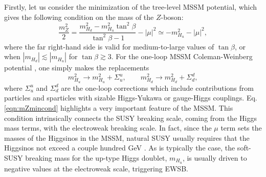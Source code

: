  Firstly, let us consider the minimization of the tree-level MSSM potential, which gives the following condition on the mass of the $Z$-boson:
\begin{equation}
\frac{m^2_Z}{2}=\frac{m^2_{H_d}-m^2_{H_u}\tan^2\beta}{\tan^2\beta-1}-|\mu|^2 \simeq -m^2_{H_u}-|\mu|^2,
\label{eqn:mZmincond}
\end{equation}
where the far right-hand side is valid for medium-to-large values of $\tan \beta$, or when $|m_{H_d}| \lesssim |m_{H_u}|$ for $\tan \beta \gtrsim 3$. For the one-loop MSSM Coleman-Weinberg potential \cite{RN684,RN683}, one simply makes the replacements
\begin{equation}
m^2_{H_u} \rightarrow m^2_{H_u} + \Sigma^u_u, \qquad  m^2_{H_d} \rightarrow m^2_{H_d} + \Sigma^d_d,
\end{equation}
where $\Sigma^u_u$ and $\Sigma^d_d$ are the one-loop corrections which include contributions from particles and sparticles with sizable Higgs-Yukawa or gauge-Higgs couplings. Eq. \ref{eqn:mZmincond} highlights a very important feature of the MSSM. This condition intrinsically connects the SUSY breaking scale, coming from the Higgs mass terms, with the electroweak breaking scale. In fact, since the $\mu$ term sets the masses of the Higgsinos in the MSSM, natural SUSY usually requires that the Higgsinos not exceed a couple hundred GeV \cite{RN685, RN686, RN684, RN687, RN688, RN689, RN690, RN691}. As is typically the case, the soft-SUSY breaking mass for the up-type Higgs doublet, $m_{H_u}$, is usually driven to negative values at the electroweak scale, triggering EWSB.

